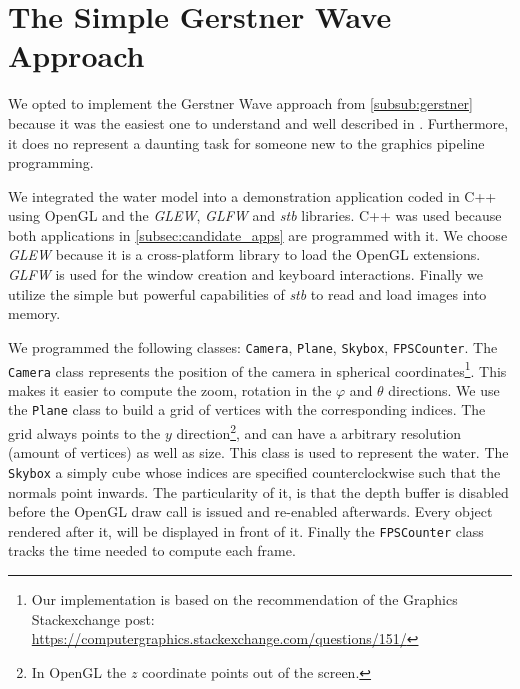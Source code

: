 \section{The Simple Gerstner Wave Approach}\label{sec:simple_gerstner_waves}


We opted to implement the Gerstner Wave approach from \cref{subsub:gerstner}
because it was the easiest one to understand and well described in
\autocite{fernando2004gpu}. Furthermore, it does no represent a daunting task
for someone new to the graphics pipeline programming.

We integrated the water model into a demonstration application coded in C++
using OpenGL and the \textit{GLEW}, \textit{GLFW} and \textit{stb} libraries.
C++ was used because both applications in \autoref{subsec:candidate_apps} are
programmed with it. We choose \textit{GLEW} because it is a cross-platform
library to load the OpenGL extensions. \textit{GLFW} is used for the window
creation and keyboard interactions. Finally we utilize the simple but powerful
capabilities of \textit{stb} to read and load images into memory.

We programmed the following classes: \texttt{Camera}, \texttt{Plane},
\texttt{Skybox}, \texttt{FPSCounter}. The \texttt{Camera} class represents the
position of the camera in spherical coordinates\footnote{Our implementation is
    based on the recommendation of the Graphics Stackexchange post:
\url{https://computergraphics.stackexchange.com/questions/151/}}. This makes it
easier to compute the zoom, rotation in the $\varphi$ and $\theta$ directions.
We use the \texttt{Plane} class to build a grid of vertices with the
corresponding indices. The grid always points to the $y$ direction\footnote{In
OpenGL the $z$ coordinate points out of the screen.}, and can have a arbitrary
resolution (amount of vertices) as well as size. This class is used to represent
the water. The \texttt{Skybox} a simply cube whose indices are specified
counterclockwise such that the normals point inwards. The particularity of it,
is that the depth buffer is disabled before the OpenGL draw call is issued and
re-enabled afterwards. Every object rendered after it, will be displayed in
front of it. Finally the \texttt{FPSCounter} class tracks the time needed to
compute each frame.

